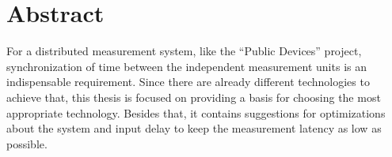 \chapter*{Abstract}
\label{ch:abstract}


For a distributed measurement system, like the “Public Devices” project, synchronization of time between the independent measurement units is an indispensable requirement. Since there are already different technologies to achieve that, this thesis is focused on providing a basis for choosing the most appropriate technology. Besides that, it contains suggestions for optimizations about the system and input delay to keep the measurement latency as low as possible.

